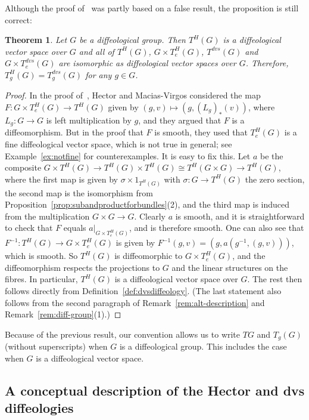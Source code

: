 \documentclass[12pt]{amsart}
\newtheorem{thm}[de]{Theorem}
\theoremstyle{remark}
\newcommand{\ra}{\to}
\begin{document}
Although the proof of~\cite[Proposition~6.8]{HM} was partly based on a false result,
the proposition is still correct:

\begin{thm}\label{thm:Tdiffgrptrivial}
Let $G$ be a diffeological group.
Then $T^H(G)$ is a diffeological vector space over $G$ and
all of $T^H(G)$, $G \times T_e^H(G)$, $T^{dvs}(G)$ and $G \times T_e^{dvs}(G)$
are isomorphic as diffeological vector spaces over $G$.
Therefore, $T_g^H(G) = T_g^{dvs}(G)$ for any $g \in G$.
\end{thm}

\begin{proof}
In the proof of~\cite[Proposition~6.8]{HM}, Hector and Macias-Virgos considered the map
$F:G \times T_e^H(G) \ra T^H(G)$ given by $(g,v) \mapsto (g,(L_g)_*(v))$,
where $L_g:G \ra G$ is left multiplication by $g$,
and they argued that $F$ is a diffeomorphism.
But in the proof that $F$ is smooth, they used that
$T_e^H(G)$ is a fine diffeological vector space, which is not true in general;
see Example~\ref{ex:notfine} for counterexamples.
It is easy to fix this.
Let $a$ be the composite $G \times T^H(G) \ra T^H(G) \times T^H(G)
\cong T^H(G \times G) \ra T^H(G)$, where the first map is given by
$\sigma \times 1_{T^H(G)}$ with $\sigma:G \ra T^H(G)$ the zero section,
the second map is the isomorphism from Proposition~\ref{prop:subandproductforbundles}(2),
and the third map is induced from the multiplication $G \times G \ra G$.
Clearly $a$ is smooth, and it is straightforward to check that $F$ equals $a|_{G \times T_e^H(G)}$,
and is therefore smooth.
One can also see that $F^{-1} : T^H(G) \to G \times T_e^H(G)$ is given by
$F^{-1}(g, v) = (g, a(g^{-1}, (g, v)))$, which is smooth.
So $T^H(G)$ is diffeomorphic to $G \times T_e^H(G)$, and the diffeomorphism
respects the projections to $G$ and the linear structures on the fibres.
In particular, $T^H(G)$ is a diffeological vector space over $G$.
The rest then follows directly from Definition~\ref{def:dvsdiffeology}.
(The last statement also follows from the second paragraph of 
Remark~\ref{rem:alt-description} and Remark~\ref{rem:diff-group}(1).)
\end{proof}

Because of the previous result, our convention allows us to write $TG$ and $T_g(G)$
(without superscripts) when $G$ is a diffeological group.
This includes the case when $G$ is a diffeological vector space.

\subsection{A conceptual description of the Hector and dvs diffeologies}\label{ss:conceptual}
\end{document}
